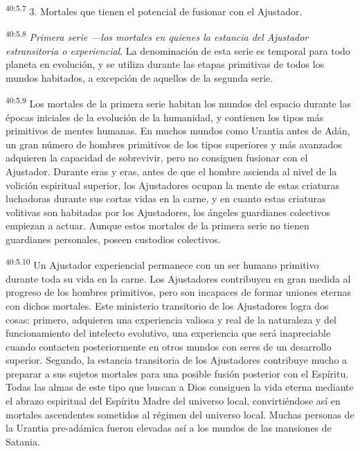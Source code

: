 \par
\textsuperscript{40:5.7} 3. Mortales que tienen el potencial de fusionar con el Ajustador.

\par
\textsuperscript{40:5.8} \textit{Primera serie ---los mortales en quienes la estancia del Ajustador estransitoria o experiencial}. La denominación de esta serie es temporal para todo planeta en evolución, y se utiliza durante las etapas primitivas de todos los mundos habitados, a excepción de aquellos de la segunda serie.

\par
\textsuperscript{40:5.9} Los mortales de la primera serie habitan los mundos del espacio durante las épocas iniciales de la evolución de la humanidad, y contienen los tipos más primitivos de mentes humanas. En muchos mundos como Urantia antes de Adán, un gran número de hombres primitivos de los tipos superiores y más avanzados adquieren la capacidad de sobrevivir, pero no consiguen fusionar con el Ajustador. Durante eras y eras, antes de que el hombre ascienda al nivel de la volición espiritual superior, los Ajustadores ocupan la mente de estas criaturas luchadoras durante sus cortas vidas en la carne, y en cuanto estas criaturas volitivas son habitadas por los Ajustadores, los ángeles guardianes colectivos empiezan a actuar. Aunque estos mortales de la primera serie no tienen guardianes personales, poseen custodios colectivos.

\par
\textsuperscript{40:5.10} Un Ajustador experiencial permanece con un ser humano primitivo durante toda su vida en la carne. Los Ajustadores contribuyen en gran medida al progreso de los hombres primitivos, pero son incapaces de formar uniones eternas con dichos mortales. Este ministerio transitorio de los Ajustadores logra dos cosas: primero, adquieren una experiencia valiosa y real de la naturaleza y del funcionamiento del intelecto evolutivo, una experiencia que será inapreciable cuando contacten posteriormente en otros mundos con seres de un desarrollo superior. Segundo, la estancia transitoria de los Ajustadores contribuye mucho a preparar a sus sujetos mortales para una posible fusión posterior con el Espíritu. Todas las almas de este tipo que buscan a Dios consiguen la vida eterna mediante el abrazo espiritual del Espíritu Madre del universo local, convirtiéndose así en mortales ascendentes sometidos al régimen del universo local. Muchas personas de la Urantia pre-adámica fueron elevadas así a los mundos de las mansiones de Satania.

